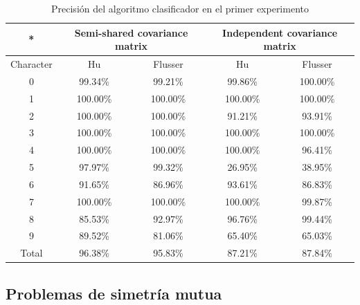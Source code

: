 \documentclass[a4paper, 11pt, oneside]{report}
\begin{document}
	\begin{table}
	\begin{center}
	\begin{tabular}{|c|c|c|c|c|}
		\hline
		* & \multicolumn{2}{|c|}{Semi-shared covariance matrix} &
			\multicolumn{2}{|c|}{Independent covariance matrix} \\
		\hline
		Character & Hu & Flusser & Hu & Flusser \\
		\hline
		0 & 99.34\% & 99.21\% & 99.86\% & 100.00\% \\
		1 &	100.00\% & 100.00\% & 100.00\% & 100.00\% \\
		2 &	100.00\% & 100.00\% & 91.21\% & 93.91\% \\
		3 &	100.00\% & 100.00\% & 100.00\% & 100.00\% \\
		4 &	100.00\% & 100.00\%	& 100.00\% & 96.41\% \\		
		5 & 97.97\% & 99.32\% & 26.95\% & 38.95\% \\ 
		6 & 91.65\% & 86.96\% & 93.61\% & 86.83\% \\
		7 & 100.00\% & 100.00\% & 100.00\% & 99.87\% \\
		8 & 85.53\% & 92.97\% & 96.76\% & 99.44\% \\
		9 &	89.52\% & 81.06\% & 65.40\% & 65.03\% \\
		\hline
		Total & 96.38\% & 95.83\% & 87.21\% & 87.84\% \\
		\hline
	\end{tabular}
	\end{center}
	\caption{Precisión del algoritmo clasificador en el primer experimento}	
	\label{tb:exp1}
	\end{table}

\subsection{Problemas de simetría mutua}
\label{sect:mutualSym}
\end{document}
